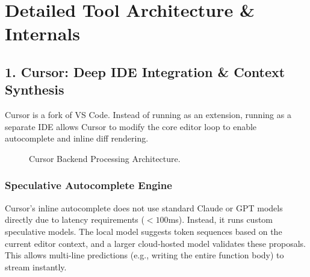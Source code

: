 \section{Detailed Tool Architecture \& Internals}

\subsection{1. Cursor: Deep IDE Integration \& Context Synthesis}

Cursor is a fork of VS Code. Instead of running as an extension, running as a separate IDE allows Cursor to modify the core editor loop to enable autocomplete and inline diff rendering.

\begin{figure}[ht]
\centering
{}
\caption{Cursor Backend Processing Architecture.}
\end{figure}

\subsubsection{Speculative Autocomplete Engine}
Cursor's inline autocomplete does not use standard Claude or GPT models directly due to latency requirements ($<100$ms). Instead, it runs custom speculative models. The local model suggests token sequences based on the current editor context, and a larger cloud-hosted model validates these proposals. This allows multi-line predictions (e.g., writing the entire function body) to stream instantly.


